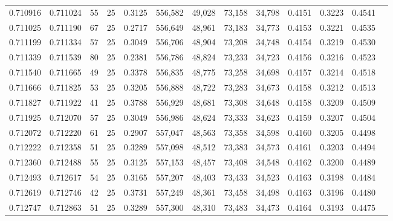 \begin{tabular}{rrrrrrrrrrrrr}
0.710916 & 0.711024 &    55 &  25 &                                     0.3125 & 556,582 &  49,028 &  73,158 &  34,798 & 0.4151 & 0.3223 & 0.4541 \\
0.711025 & 0.711190 &    67 &  25 &                                     0.2717 & 556,649 &  48,961 &  73,183 &  34,773 & 0.4153 & 0.3221 & 0.4535 \\
0.711199 & 0.711334 &    57 &  25 &                                     0.3049 & 556,706 &  48,904 &  73,208 &  34,748 & 0.4154 & 0.3219 & 0.4530 \\
0.711339 & 0.711539 &    80 &  25 &                                     0.2381 & 556,786 &  48,824 &  73,233 &  34,723 & 0.4156 & 0.3216 & 0.4523 \\
0.711540 & 0.711665 &    49 &  25 &                                     0.3378 & 556,835 &  48,775 &  73,258 &  34,698 & 0.4157 & 0.3214 & 0.4518 \\
0.711666 & 0.711825 &    53 &  25 &                                     0.3205 & 556,888 &  48,722 &  73,283 &  34,673 & 0.4158 & 0.3212 & 0.4513 \\
0.711827 & 0.711922 &    41 &  25 &                                     0.3788 & 556,929 &  48,681 &  73,308 &  34,648 & 0.4158 & 0.3209 & 0.4509 \\
0.711925 & 0.712070 &    57 &  25 &                                     0.3049 & 556,986 &  48,624 &  73,333 &  34,623 & 0.4159 & 0.3207 & 0.4504 \\
0.712072 & 0.712220 &    61 &  25 &                                     0.2907 & 557,047 &  48,563 &  73,358 &  34,598 & 0.4160 & 0.3205 & 0.4498 \\
0.712222 & 0.712358 &    51 &  25 &                                     0.3289 & 557,098 &  48,512 &  73,383 &  34,573 & 0.4161 & 0.3203 & 0.4494 \\
0.712360 & 0.712488 &    55 &  25 &                                     0.3125 & 557,153 &  48,457 &  73,408 &  34,548 & 0.4162 & 0.3200 & 0.4489 \\
0.712493 & 0.712617 &    54 &  25 &                                     0.3165 & 557,207 &  48,403 &  73,433 &  34,523 & 0.4163 & 0.3198 & 0.4484 \\
0.712619 & 0.712746 &    42 &  25 &                                     0.3731 & 557,249 &  48,361 &  73,458 &  34,498 & 0.4163 & 0.3196 & 0.4480 \\
0.712747 & 0.712863 &    51 &  25 &                                     0.3289 & 557,300 &  48,310 &  73,483 &  34,473 & 0.4164 & 0.3193 & 0.4475 \\

\end{tabular}
